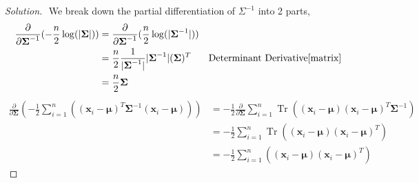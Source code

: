 \documentclass{article}
\newenvironment{solution}
  {\renewcommand\qedsymbol{$\blacksquare$}\begin{proof}[Solution]$ $}
  {\end{proof}}
\newcommand{\vect}[1]{\boldsymbol{#1}}
\DeclareMathOperator{\Tr}{Tr}
\begin{document}
\begin{Exercise}
\begin{solution}
        We break down the partial differentiation of \(\Sigma^{-1}\) into 2 parts,
        \begin{align*}
            \frac{\partial}{\partial \vect \Sigma^{-1}}(-\frac{n}{2}\log (|\vect{\Sigma}|))
             & = \frac{\partial}{\partial \vect \Sigma^{-1}}(\frac{n}{2}\log (|\vect{\Sigma}^{-1}|))                                              \\
             & = \frac{n}{2}\frac{1}{|\vect{\Sigma}^{-1}|}|\vect{\Sigma}^{-1}|(\vect{\Sigma})^T      & \text{Determinant Derivative}\cite{matrix} \\
             & = \frac{n}{2}\vect{\Sigma}                                                                                                         \\
        \end{align*}
        \begin{align*}
            \frac{\partial}{\partial \vect{\Sigma}}(-\frac{1}{2}\sum_{i=1}^n ((\vect{x}_i-\vect{\mu})^T \vect{\Sigma}^{-1} (\vect{x}_i -\vect \mu)))
             & = -\frac{1}{2} \frac{\partial}{\partial \vect{\Sigma}} \sum_{i=1}^n \Tr((\vect{x}_i-\vect{\mu}) (\vect{x}_i -\vect \mu)^T \vect{\Sigma}^{-1}) \\
             & = -\frac{1}{2} \sum_{i=1}^n \Tr((\vect{x}_i-\vect{\mu}) (\vect{x}_i -\vect \mu)^T)                                                            \\
             & = -\frac{1}{2} \sum_{i=1}^n ((\vect{x}_i-\vect{\mu}) (\vect{x}_i -\vect \mu)^T)
        \end{align*}


\end{solution}
\end{Exercise}
\end{document}
